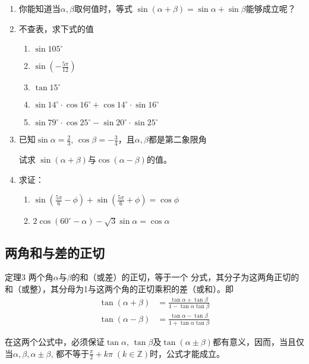 \begin{ex}
\begin{enumerate}
    \item 你能知道当$\alpha,\beta$取何值时，等式
    $\sin(\alpha+\beta)=\sin\alpha+\sin\beta$能够成立呢？
\item 不查表，求下式的值
\begin{enumerate}
    \item $\sin 105^{\circ}$
    \item $\sin\left(-\frac{5\pi}{12}\right)$
    \item $\tan 15^{\circ}$
    \item $\sin 14^{\circ}\cdot \cos 16^{\circ}+\cos 14^{\circ}\cdot \sin 16^{\circ}$
    \item $\sin 79^{\circ}\cdot \cos 25^{\circ}-\sin 20^{\circ}\cdot \sin 25^{\circ}$
\end{enumerate}
\item 已知$\sin\alpha=\frac{2}{3}$, $\cos\beta=-\frac{3}{4}$，且$\alpha,\beta$都是第二象限角

试求
$\sin(\alpha+\beta)$与$\cos(\alpha-\beta)$的值。
\item 求证：
\begin{enumerate}
    \item $\sin\left(\frac{5\pi}{6}-\phi\right)+\sin\left(\frac{5\pi}{6}+\phi\right)=\cos\phi$
    \item $2\cos(60^{\circ}-\alpha)-\sqrt{3}\sin\alpha=\cos\alpha$
\end{enumerate}
\end{enumerate}
\end{ex}

\subsection{两角和与差的正切}
\begin{blk}{定理3}
    两个角$\alpha$与$\beta$的和（或差）的正切，等于一个
分式，其分子为这两角正切的和（或整），其分母为1与这两个角的正切乘积的差（或和）。即
\begin{align}
    \tan(\alpha+\beta)&=\frac{\tan\alpha+\tan\beta}{1-\tan\alpha\tan\beta}\\
    \tan(\alpha-\beta)&=\frac{\tan\alpha-\tan\beta}{1+\tan\alpha\tan\beta}
\end{align}
\end{blk}

\begin{rmk}
    在这两个公式中，必须保证$\tan\alpha$, $\tan\beta$及$\tan(\alpha\pm\beta)$都有意义，因而，当且仅当$\alpha,\beta,\alpha\pm\beta$, 都不等于$\frac{\pi}{2}+k\pi\; (k\in\mathbb{Z})$时，公式才能成立。
\end{rmk}

